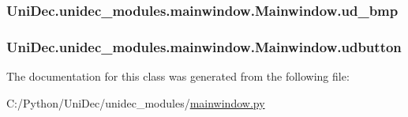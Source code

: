 \subsubsection[{ud\+\_\+bmp}]{\setlength{\rightskip}{0pt plus 5cm}Uni\+Dec.\+unidec\+\_\+modules.\+mainwindow.\+Mainwindow.\+ud\+\_\+bmp}\label{class_uni_dec_1_1unidec__modules_1_1mainwindow_1_1_mainwindow_a6685c55b42c167bc2be2cfdcbbdf878b}
\hypertarget{class_uni_dec_1_1unidec__modules_1_1mainwindow_1_1_mainwindow_a40e72b4c47ed6e08dd4fc8e5a501eeae}{}
\subsubsection[{udbutton}]{\setlength{\rightskip}{0pt plus 5cm}Uni\+Dec.\+unidec\+\_\+modules.\+mainwindow.\+Mainwindow.\+udbutton}\label{class_uni_dec_1_1unidec__modules_1_1mainwindow_1_1_mainwindow_a40e72b4c47ed6e08dd4fc8e5a501eeae}


The documentation for this class was generated from the following file\+:\begin{DoxyCompactItemize}
\item 
C\+:/\+Python/\+Uni\+Dec/unidec\+\_\+modules/\hyperlink{mainwindow_8py}{mainwindow.\+py}\end{DoxyCompactItemize}
